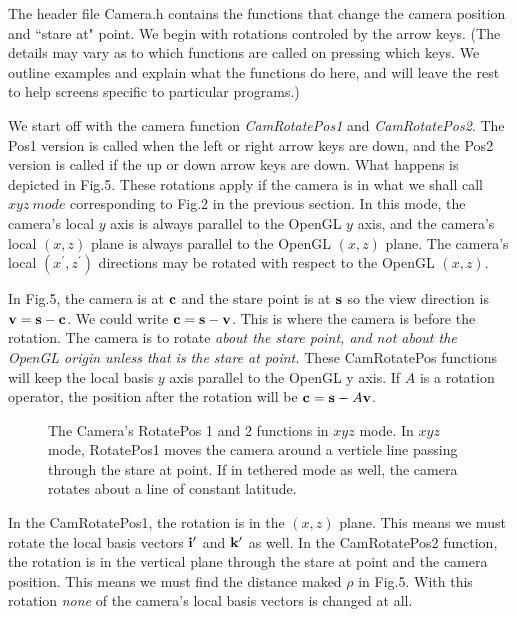 \documentclass[12pt]{article}
\begin{document}
The header file Camera.h contains the functions that change the
camera position and ``stare at" point. We begin with rotations
controled by the arrow keys. (The details may vary as to which functions
are called on pressing which keys. We outline examples and explain
what the functions do here, and will leave the rest to help screens 
specific to particular programs.)

We start off with the camera function {\it CamRotatePos1}
and {\it CamRotatePos2}. The Pos1 version is called when the left or right
arrow keys are down, and the Pos2 version is called if the up or down
arrow keys are down. What happens is depicted in Fig.5. 
These rotations apply if the camera is in what we shall call $xyz \> mode$
corresponding to Fig.2 in the previous section.
In this mode, the camera's local $y$ axis is always parallel to the OpenGL
$y$ axis, and the camera's local $(x,z)$ plane is always parallel to the
OpenGL $(x,z)$ plane. The camera's local $(x^\prime,z^\prime)$ directions
may be rotated with respect to the OpenGL $(x,z)$.

In Fig.5, the camera is at $\bf c$ and the stare point is at $\bf s$
 so the view direction is ${\bf v}={\bf s}-{\bf c}$. We could write
${\bf c}={\bf s}-{\bf v}$. This is where the camera is before the rotation.
The camera is to rotate {\it about the stare point, and not about the OpenGL
origin unless that is the stare at point.}  These CamRotatePos functions
will keep the local basis $y$ axis parallel to the OpenGL y axis. If
$A$ is a rotation operator, the position after the rotation will be 
${\bf c}={\bf s}-A{\bf v}$. 
\begin{figure}[htb]
\vspace*{10cm}
\caption{ 
The Camera's RotatePos 1 and 2 functions in $xyz$ mode. In $xyz$ mode,
RotatePos1 moves the camera around a verticle line passing through
the stare at point. If in tethered mode as well, the camera rotates about
a line of constant latitude.
}
\end{figure}

In the CamRotatePos1, the rotation is in the $(x,z)$ plane. This means we
must rotate the local basis vectors ${\bf i}^\prime$ and ${\bf k}^\prime$
as well. In the CamRotatePos2 function, the rotation is in the vertical
plane through the stare at point and the camera position. This means
we must find the distance maked $\rho$ in Fig.5. With this rotation 
{\it none} of the camera's local basis vectors is changed at all.
\end{document}
